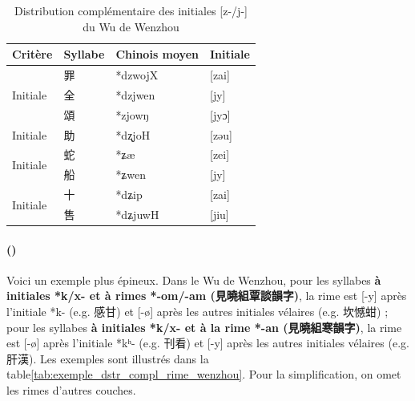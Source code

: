 \documentclass{scrbook}
\newcounter{c}[subsubsection]
\newcommand{\stpc}[1]{\stepcounter{#1}}
\newcommand{\illustre}{Les exemples sont illustrés dans la table\xspace}
\newcommand{\termyyx}[1]{\textbf{#1}}
\begin{document}
\begin{sloppypar}
\begin{table}[htbp]
  \centering
    \begin{tabular}{llll}
    \toprule
    Critère & Syllabe & Chinois moyen  & Initiale \\
    \midrule
    \multirow{3}[2]{*}{Initiale} & 罪     & *dzwojX & [zai] \\
          & 全     & *dzjwen & [jy] \\
          & 頌     & *zjowŋ & [jyɔ] \\
    \midrule
    Initiale & 助     & *dʐjoH & [zəu] \\
    \midrule
    \multirow{2}[2]{*}{Initiale} & 蛇     & *ʑæ   & [zei] \\
          & 船     & *ʑwen & [jy] \\
    \midrule
    \multirow{2}[2]{*}{Initiale} & 十     & *dʑip & [zai] \\
          & 售     & *dʑjuwH & [jiu] \\
    \bottomrule
    \end{tabular}%
  \caption{Distribution complémentaire des initiales [z-/j-] du Wu de Wenzhou}
  \label{tab:exemple_dstr_compl_initiale_wenzhou}%
\end{table}%

\stpc{c}\paragraph{()}
Voici un exemple plus épineux. Dans le Wu de Wenzhou, pour les syllabes \termyyx{à initiales *k/x- et à rimes *-om/-am (見曉組覃談韻字)}, la rime est [-y] après l'initiale *k- (e.g. 感甘) et [-ø] après les autres initiales vélaires (e.g. 坎憾蚶) ; pour les syllabes \termyyx{à initiales *k/x- et à la rime *-an (見曉組寒韻字)}, la rime est [-ø] après l'initiale *kʰ- (e.g. 刊看) et [-y] après les autres initiales vélaires (e.g. 肝漢). \illustre \ref{tab:exemple_dstr_compl_rime_wenzhou}. Pour la simplification, on omet les rimes d'autres couches.


\end{sloppypar}
\end{document}
